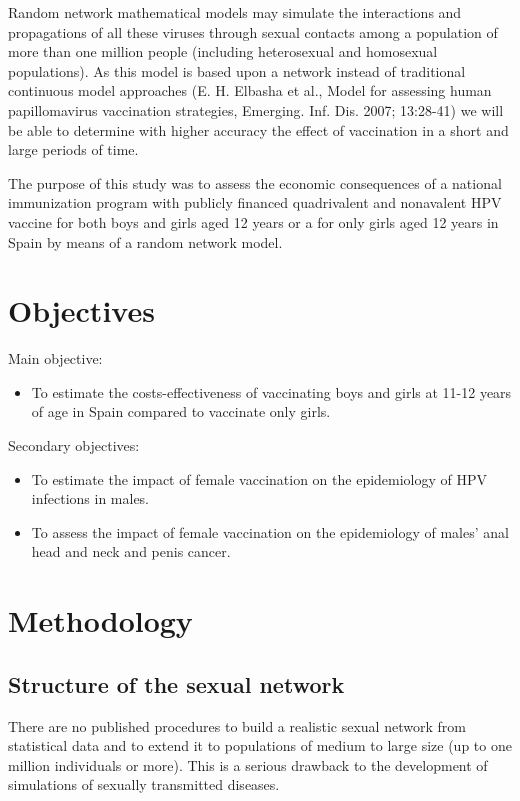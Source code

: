 Random network mathematical models may simulate the interactions and propagations of all these viruses through sexual contacts among a population of more than one million people (including heterosexual and homosexual populations). As this model is based upon a network instead of traditional continuous model approaches (E. H. Elbasha et al., Model for assessing human papillomavirus vaccination strategies,  Emerging. Inf. Dis.  2007; 13:28-41) we will be able to determine with higher accuracy the effect of vaccination in a short and large periods of time.

The purpose of this study was to assess the economic consequences of a national immunization program with publicly financed quadrivalent and nonavalent HPV vaccine for both boys and girls aged 12 years or a for only girls aged 12 years in Spain by means of a random network model. 

\section{Objectives}
Main objective:
\begin{itemize}
	\item To estimate the costs-effectiveness of vaccinating boys and girls at 11-12 years of age in Spain compared to vaccinate only girls.
\end{itemize}
Secondary objectives:
\begin{itemize}
	\item To estimate the impact of female vaccination on the epidemiology of HPV infections in males.
	\item To assess the impact of female vaccination on the epidemiology of males' anal head and neck and penis cancer.
\end{itemize}

\section{Methodology}

\subsection{Structure of the sexual network}

There are no published procedures to build a realistic sexual network from statistical data and to extend it to populations of medium to large size (up to one million individuals or more). This is a serious drawback to the development of simulations of sexually transmitted diseases. 

